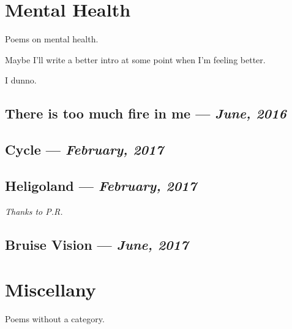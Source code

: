 \documentclass[10pt]{memoir}
\begin{document}

  \chapter{Mental Health}

  Poems on mental health.

  \vfill

  \noindent Maybe I'll write a better intro at some point when I'm feeling better.

  \vfill

  \hfill I dunno.
  \thispagestyle{empty}
  \newpage


  \section{There is too much fire in me --- \textit{June, 2016}}

  
  \newpage


  \section{Cycle --- \textit{February, 2017}}

  
  \newpage


  \section{Heligoland --- \textit{February, 2017}}

  

  \textit{Thanks to P.R.}
  \newpage


  \section{Bruise Vision --- \textit{June, 2017}}

  
  \newpage


  \chapter{Miscellany}

  Poems without a category.
  \thispagestyle{empty}
  \newpage
\end{document}

